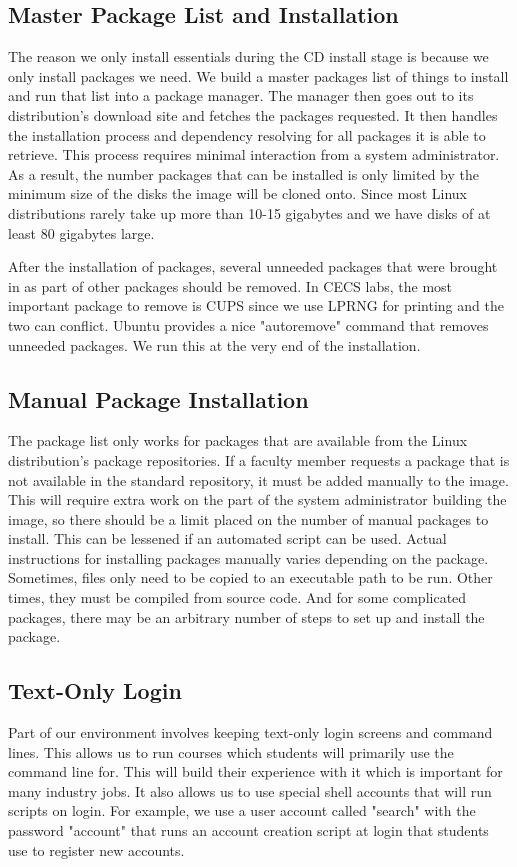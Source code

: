 \subsection{Master Package List and Installation}
The reason we only install essentials during the CD install stage is because we only install packages we need.  We build a master packages list of things to install and run that list into a package manager.  The manager then goes out to its distribution's download site and fetches the packages requested.  It then handles the installation process and dependency resolving for all packages it is able to retrieve.  This process requires minimal interaction from a system administrator.  As a result, the number packages that can be installed is only limited by the minimum size of the disks the image will be cloned onto.  Since most Linux distributions rarely take up more than 10-15 gigabytes and we have disks of at least 80 gigabytes large.  

After the installation of packages, several unneeded packages that were brought in as part of other packages should be removed.  In CECS labs, the most important package to remove is CUPS since we use LPRNG for printing and the two can conflict. Ubuntu provides a nice "autoremove" command that removes unneeded packages. We run this at the very end of the installation. 

\subsection{Manual Package Installation}
The package list only works for packages that are available from the Linux distribution's package repositories.  If a faculty member requests a package that is not available in the standard repository, it must be added manually to the image.  This will require extra work on the part of the system administrator building the image, so there should be a limit placed on the number of manual packages to install.  This can be lessened if an automated script can be used.  Actual instructions for installing packages manually varies depending on the package.  Sometimes, files only need to be copied to an executable path to be run.  Other times, they must be compiled from source code.  And for some complicated packages, there may be an arbitrary number of steps to set up and install the package.  

\subsection{Text-Only Login}
Part of our environment involves keeping text-only login screens and command lines.  This allows us to run courses which students will primarily use the command line for.  This will build their experience with it which is important for many industry jobs.  It also allows us to use special shell accounts that will run scripts on login.  For example, we use a user account called "search" with the password "account" that runs an account creation script at login that students use to register new accounts.  

